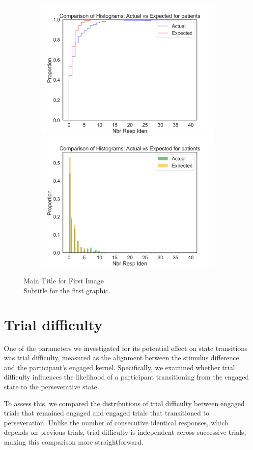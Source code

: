 \begin{figure}[H]
    \centering
    \includegraphics[width=12cm,height=7cm]{MainLayout/Images/chapter9/actual_expected_patients_ecdf.jpg}
    \includegraphics[width=12cm,height=7cm]{MainLayout/Images/chapter9/actual_expected_patients_hist.jpg}
    \caption{Main Title for First Image \\ \small Subtitle for the first graphic.}
    \label{fig:actual_expected_patients}
\end{figure}

\section{Trial difficulty} 
One of the parameters we investigated for its potential effect on state transitions was trial difficulty, measured as the alignment between the stimulus difference and the participant’s engaged kernel. Specifically, we examined whether trial difficulty influences the likelihood of a participant transitioning from the engaged state to the perseverative state.

To assess this, we compared the distributions of trial difficulty between engaged trials that remained engaged and engaged trials that transitioned to perseveration. Unlike the number of consecutive identical responses, which depends on previous trials, trial difficulty is independent across successive trials, making this comparison more straightforward.

